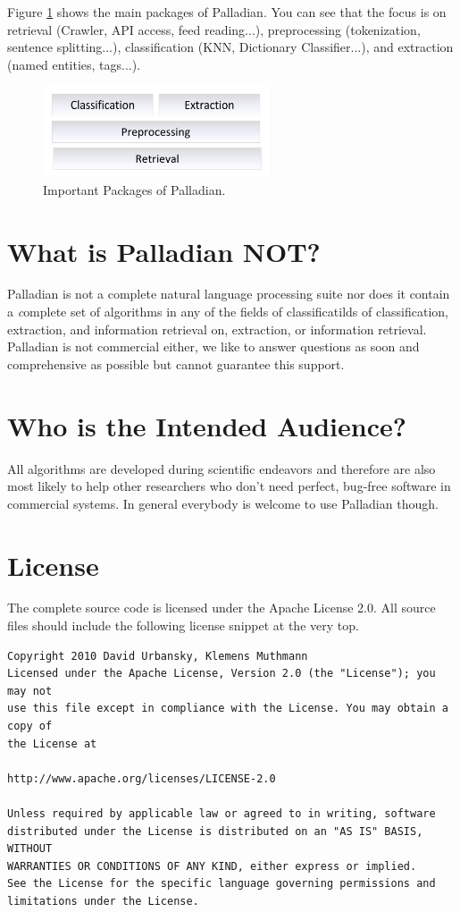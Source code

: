 \documentclass[a4paper,twoside]{book}      %
\begin{document}
Figure \ref{fig:architecture} shows the main packages of Palladian. You can see that the focus is on retrieval (Crawler, API access, feed reading...), preprocessing (tokenization, sentence splitting...), classification (KNN, Dictionary Classifier...), and extraction (named entities, tags...).

\begin{figure}[ht!]
\centering
\includegraphics[width=0.6\textwidth]{img/architecture.pdf}
\caption{Important Packages of Palladian.}
\label{fig:architecture}
\end{figure}

\section{What is Palladian NOT?}
Palladian is not a complete natural language processing suite nor does it contain a {\textit complete} set of algorithms in any of the fields of classificatilds of classification, extraction, and information retrieval on, extraction, or information retrieval. Palladian is not commercial either, we like to answer questions as soon and comprehensive as possible but cannot guarantee this support.

\section{Who is the Intended Audience?}
All algorithms are developed during scientific endeavors and therefore are also most likely to help other researchers who don't need perfect, bug-free software in commercial systems. In general everybody is welcome to use Palladian though.

\section{License}
The complete source code is licensed under the Apache License 2.0. All source files should include the following license snippet at the very top.

\begin{verbatim}
Copyright 2010 David Urbansky, Klemens Muthmann
Licensed under the Apache License, Version 2.0 (the "License"); you may not
use this file except in compliance with the License. You may obtain a copy of
the License at

http://www.apache.org/licenses/LICENSE-2.0

Unless required by applicable law or agreed to in writing, software
distributed under the License is distributed on an "AS IS" BASIS, WITHOUT
WARRANTIES OR CONDITIONS OF ANY KIND, either express or implied.
See the License for the specific language governing permissions and
limitations under the License.
\end{verbatim}
\end{document}
